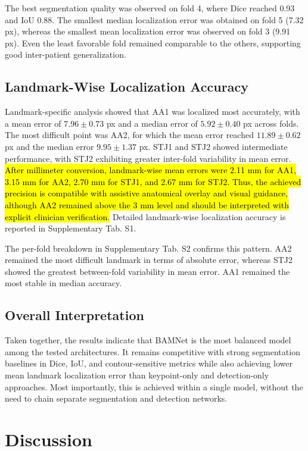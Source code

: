 \documentclass[utf8]{FrontiersinHarvard}
\begin{document}
The best segmentation quality was observed on fold 4, where Dice reached 0.93 and IoU 0.88. The smallest median localization error 
was obtained on fold 5 (7.32 px), whereas the smallest mean localization error was observed on fold 3 (9.91 px). Even the least 
favorable fold remained comparable to the others, supporting good inter-patient generalization.

\subsection{Landmark-Wise Localization Accuracy}

Landmark-specific analysis showed that AA1 was localized most accurately, with a mean error of $7.96 \pm 0.73$ px and a median
error of $5.92 \pm 0.40$ px across folds. The most difficult point was AA2, for which the mean error reached $11.89 \pm 0.62$ px
and the median error $9.95 \pm 1.37$ px. STJ1 and STJ2 showed intermediate performance, with STJ2 exhibiting greater inter-fold
variability in mean error. \hl{After millimeter conversion, landmark-wise mean errors were 2.11 mm for AA1, 3.15 mm for AA2, 2.70 mm for STJ1, and 2.67 mm for STJ2. Thus, the achieved precision is compatible with assistive anatomical overlay and visual guidance, although AA2 remained above the 3 mm level and should be interpreted with explicit clinician verification.} 
Detailed landmark-wise localization accuracy is reported in Supplementary Tab. S1.

The per-fold breakdown in Supplementary Tab. S2 confirms this pattern. AA2 remained the most difficult landmark in terms of 
absolute error, whereas STJ2 showed the greatest between-fold variability in mean error. AA1 remained the most stable in median accuracy.

\subsection{Overall Interpretation}

Taken together, the results indicate that BAMNet is the most balanced model among the tested architectures. It remains 
competitive with strong segmentation baselines in Dice, IoU, and contour-sensitive metrics while also achieving lower mean 
landmark localization error than keypoint-only and detection-only approaches. Most importantly, this is achieved within a 
single model, without the need to chain separate segmentation and detection networks.

\section{Discussion}
\end{document}
